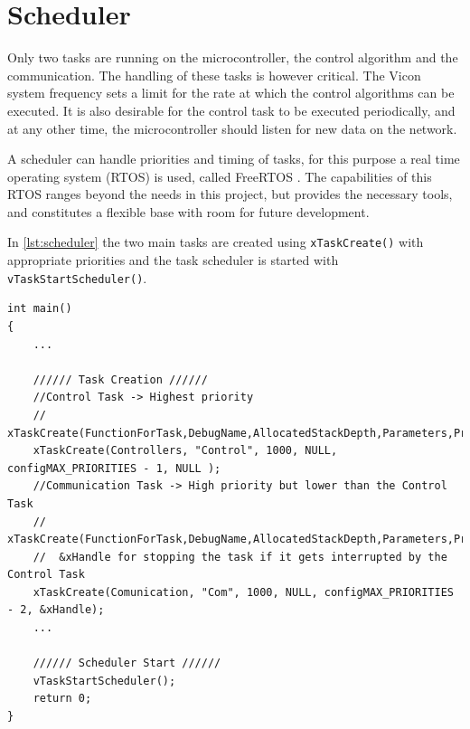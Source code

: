 \section{Scheduler}\label{sec:Scheduler}
Only two tasks are running on the microcontroller, the control algorithm and the communication. The handling of these tasks is however critical. The Vicon system frequency sets a limit for the rate at which the control algorithms can be executed. It is also desirable for the control task to be executed periodically, and at any other time, the microcontroller should listen for new data on the network.

A scheduler can handle priorities and timing of tasks, for this purpose a real time operating system (RTOS) is used, called FreeRTOS \cite{freeRtos}. The capabilities of this RTOS ranges beyond the needs in this project, but provides the necessary tools, and constitutes a flexible base with room for future development.

In \autoref{lst:scheduler} the two main tasks are created using \lstinline[style=customcppinline]{xTaskCreate()} with appropriate priorities and the task scheduler is started with \lstinline[style=customcppinline]{vTaskStartScheduler()}.

\begin{lstlisting}[style=customcpp,
                    caption={Code for initialization, creation of the different tasks, start sequence for the motors and call to the scheduler.}, 
                    label=lst:scheduler]
int main()
{
    ... 
    
    ////// Task Creation //////
    //Control Task -> Highest priority
	// xTaskCreate(FunctionForTask,DebugName,AllocatedStackDepth,Parameters,Priority,TaskHandle)
    xTaskCreate(Controllers, "Control", 1000, NULL, configMAX_PRIORITIES - 1, NULL );
    //Communication Task -> High priority but lower than the Control Task
    // xTaskCreate(FunctionForTask,DebugName,AllocatedStackDepth,Parameters,Priority,TaskHandle)
	//	&xHandle for stopping the task if it gets interrupted by the Control Task
    xTaskCreate(Comunication, "Com", 1000, NULL, configMAX_PRIORITIES - 2, &xHandle);
    ...

    ////// Scheduler Start //////
    vTaskStartScheduler();
    return 0;
}
\end{lstlisting}

